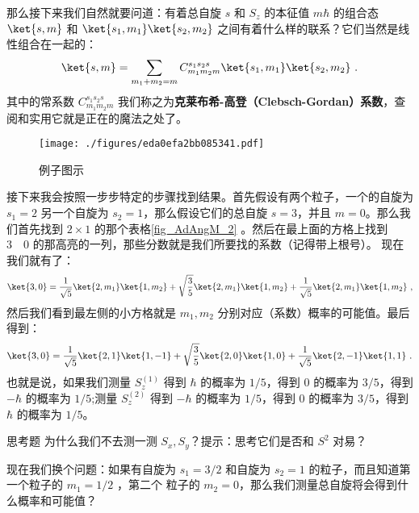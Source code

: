 那么接下来我们自然就要问道：有着总自旋 $s$ 和 $S_z$ 的本征值 $m\hbar$ 的组合态 $\ket{s,m}$ 和 $\ket{s_1,m_1}\ket{s_2,m_2}$ 之间有着什么样的联系？它们当然是线性组合在一起的：
\begin{equation}
\ket{s,m}=\sum_{m_1+m_2=m}C^{s_1s_2s}_{m_1m_2m}\ket{s_1,m_1}\ket{s_2,m_2}~.
\end{equation}
其中的常系数 $C^{s_1s_2s}_{m_1m_2m}$ 我们称之为\textbf{克莱布希-高登（Clebsch-Gordan）系数}，查阅和实用它就是正在的魔法之处了。
\begin{figure}[ht]
\centering
\texttt{[image: ./figures/eda0efa2bb085341.pdf]}
\caption{例子图示} \label{fig_AdAngM_2}
\end{figure}
接下来我会按照一步步特定的步骤找到结果。首先假设有两个粒子，一个的自旋为 $s_1 = 2$ 另一个自旋为 $s_2 = 1$，那么假设它们的总自旋 $s=3$，并且 $m=0$。那么我们首先找到 $2\times 1$ 的那个表格\autoref{fig_AdAngM_2}  。然后在最上面的方格上找到 $3\quad 0$ 的那高亮的一列，那些分数就是我们所要找的系数（记得带上根号）。
现在我们就有了：
\begin{equation}
\ket{3,0}=\frac{1}{\sqrt{5}}\ket{2,m_1}\ket{1,m_2}+\sqrt{\frac{3}{5}}\ket{2,m_1}\ket{1,m_2}+\frac{1}{\sqrt{5}}\ket{2,m_1}\ket{1,m_2}~,
\end{equation}
然后我们看到最左侧的小方格就是 $m_1,m_2$ 分别对应（系数）概率的可能值。最后得到：
\begin{equation}
\ket{3,0}=\frac{1}{\sqrt{5}}\ket{2,1}\ket{1,-1}+\sqrt{\frac{3}{5}}\ket{2,0}\ket{1,0}+\frac{1}{\sqrt{5}}\ket{2,-1}\ket{1,1}~.
\end{equation}
也就是说，如果我们测量 $S_z^{(1)}$ 得到 $\hbar$ 的概率为 $1/5$，得到 $0$ 的概率为 $3/5$，得到 $-\hbar$ 的概率为 $1/5$;测量 $S_z^{(2)}$ 得到 $-\hbar$ 的概率为 $1/5$，得到 $0$ 的概率为 $3/5$，得到 $\hbar$ 的概率为 $1/5$。

\begin{exercise}{思考题}
为什么我们不去测一测 $S_x,S_y$？提示：思考它们是否和 $S^2$ 对易？
\end{exercise}

现在我们换个问题：如果有自旋为 $s_1=3/2$ 和自旋为 $s_2= 1 $ 的粒子，而且知道第一个粒子的 $ m_1 =1/2$ ，第二个
粒子的 $ m_2 =0$，那么我们测量总自旋将会得到什么概率和可能值？


